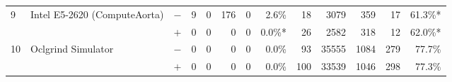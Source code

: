 \begin{tabular}{lll | rrrrr | rrrrr }
\hline
\multirow{ 2}{*}{9} & \multirow{ 2}{*}{Intel E5-2620 (ComputeAorta)} & $-$ & 9 & 0 & 176 & 0 & 2.6\%       & 18 & 3079 & 359 & 17 & 61.3\%* \\& & $+$ & 0 & 0 & 0 & 0 & 0.0\%* & 26 & 2582 & 318 & 12 & 62.0\%* \\
\hline
\multirow{ 2}{*}{10} & \multirow{ 2}{*}{Oclgrind Simulator} & $-$ & 0 & 0 & 0 & 0 & 0.0\%       & 93 & 35555 & 1084 & 279 & 77.7\% \\& & $+$ & 0 & 0 & 0 & 0 & 0.0\% & 100 & 33539 & 1046 & 298 & 77.3\% \\
  \bottomrule
\end{tabular}

